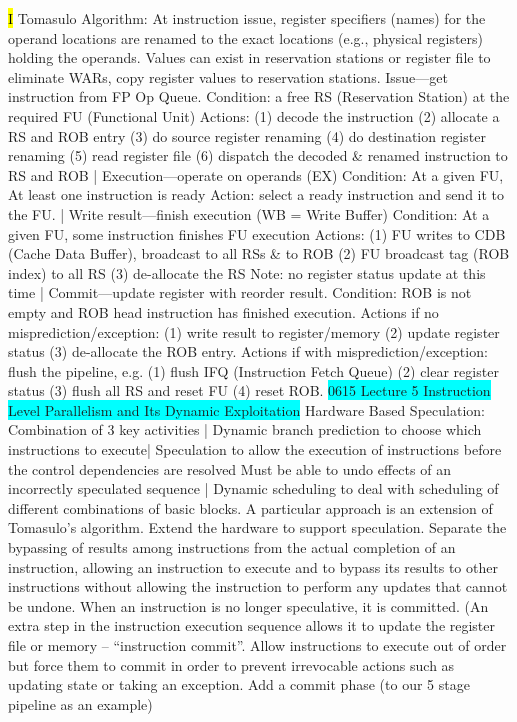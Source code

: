 \documentclass[fontsize=4pt]{scrartcl}
\begin{document}
\hl{I}
Tomasulo Algorithm: At instruction issue, register specifiers (names) for the operand locations are renamed to the exact locations (e.g., physical registers) holding the operands. Values can exist in reservation stations or register file
to eliminate WARs, copy register values to reservation stations. Issue—get instruction from FP Op Queue. Condition: a free RS (Reservation Station) at the required FU (Functional Unit) Actions: (1) decode the instruction (2) allocate a RS and ROB entry (3) do source register renaming (4) do destination register renaming (5) read register file (6) dispatch the decoded \& renamed instruction to RS and ROB | Execution—operate on operands (EX) Condition: At a given FU, At least one instruction is ready Action: select a ready instruction and send it to the FU. | Write result—finish execution (WB = Write Buffer)
Condition: At a given FU, some instruction finishes FU execution Actions: (1) FU writes to CDB (Cache Data Buffer), broadcast to all RSs \& to ROB (2) FU broadcast tag (ROB index) to all RS (3) de-allocate the RS Note: no register status update at this time | Commit—update register with reorder result. Condition: ROB is not empty and ROB head instruction has finished execution. Actions if no misprediction/exception: (1) write result to register/memory (2) update register status (3) de-allocate the ROB entry. Actions if with misprediction/exception: flush the pipeline, e.g. (1) flush IFQ (Instruction Fetch Queue) (2) clear register status (3) flush all RS and reset FU (4) reset ROB. 
\colorbox{Cyan}{0615 Lecture 5 Instruction Level Parallelism and Its Dynamic Exploitation}
Hardware Based Speculation: Combination of 3 key activities | Dynamic branch prediction to choose which instructions to execute| Speculation to allow the execution of instructions before the control dependencies are resolved Must be able to undo effects of an incorrectly speculated sequence | Dynamic scheduling to deal with scheduling of different combinations of basic blocks. A particular approach is an extension of Tomasulo’s algorithm. Extend the hardware to support speculation. Separate the bypassing of results among instructions from the actual completion of an instruction, allowing an instruction to execute and to bypass its results to other instructions without allowing the instruction to perform any updates that cannot be undone. When an instruction is no longer speculative, it is committed. (An extra step in the instruction execution sequence allows it to update the register file or memory – “instruction commit”. Allow instructions to execute out of order but force them to commit in order to prevent irrevocable actions such as updating state or taking an exception. Add a commit phase (to our 5 stage pipeline as an example)
\end{document}
